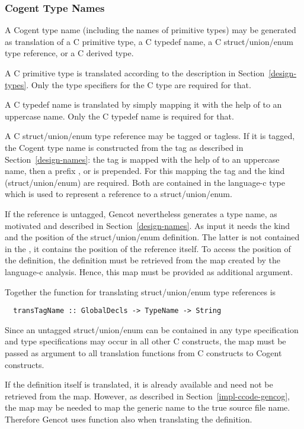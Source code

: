 \subsubsection{Cogent Type Names}

A Cogent type name (including the names of primitive types) may be generated as translation of a C 
primitive type, a C typedef name, a C struct/union/enum type reference, or a C derived type. 

A C primitive type is translated according to the description in Section~\ref{design-types}. Only the
type specifiers for the C type are required for that.

A C typedef name is translated by simply mapping it with the help of  to an uppercase name.
Only the C typedef name is required for that.

A C struct/union/enum type reference may be tagged or tagless. If it is tagged, the Cogent type name is
constructed from the tag as described in Section~\ref{design-names}: the tag is mapped with the help of
 to an uppercase name, then a prefix ,  or  is 
prepended. For this mapping the tag and the kind (struct/union/enum) are required. Both are contained
in the language-c type  which is used to represent a reference to a struct/union/enum.

If the reference is untagged, Gencot nevertheless generates a type name, as motivated and described 
in Section~\ref{design-names}. As input it needs the kind and the position of the struct/union/enum 
definition. The latter is not contained in the , it contains the position of the reference
itself. To access the position of the definition, the definition must be retrieved from the 
 map created by the language-c analysis. Hence, this map must be provided as additional 
argument.

Together the function for translating struct/union/enum type references is
\begin{verbatim}
  transTagName :: GlobalDecls -> TypeName -> String
\end{verbatim}

Since an untagged struct/union/enum can be contained in any type specification and type specifications
may occur in all other C constructs, the  map must be passed as argument to all translation
functions from C constructs to Cogent constructs.

If the definition itself is translated, it is already available and need not be retrieved from the map. 
However, as described in Section~\ref{impl-ccode-gencog}, the map may be needed to map the generic name
 to the true source file name. Therefore Gencot uses function  also when
translating the definition.

